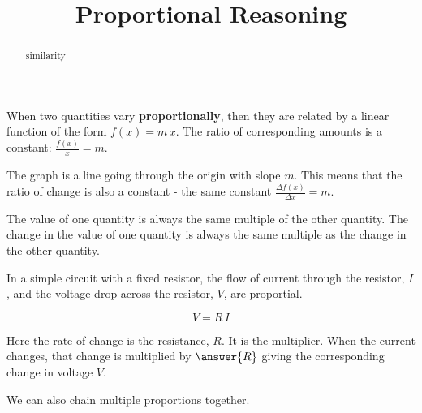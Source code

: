 \documentclass{ximera}
\title{Proportional Reasoning}
\begin{document}
\begin{abstract}
similarity
\end{abstract}
\maketitle



When two quantities vary \textbf{proportionally}, then they are related by a linear function of the form $f(x) = m \, x$.  The ratio of corresponding amounts is a constant: $\frac{f(x)}{x} = m$.   

The graph is a line going through the origin with slope $m$.  This means that the ratio of change is also a constant - the same constant $\frac{\Delta f(x)}{\Delta x} = m$. 

The value of one quantity is always the same multiple of the other quantity. The change in the value of one quantity is always the same multiple as the change in the other quantity.




\begin{example}
In a simple circuit with a fixed resistor, the flow of current through the resistor, $I$, and the voltage drop across the resistor, $V$, are proportial.

\[   V = R \, I  \]

Here the rate of change is the resistance, $R$.  It is the multiplier.   When the current changes, that change is multiplied by $\answer{R}$ giving the corresponding change in voltage $V$.


\end{example}







We can also chain multiple proportions together.
\end{document}
